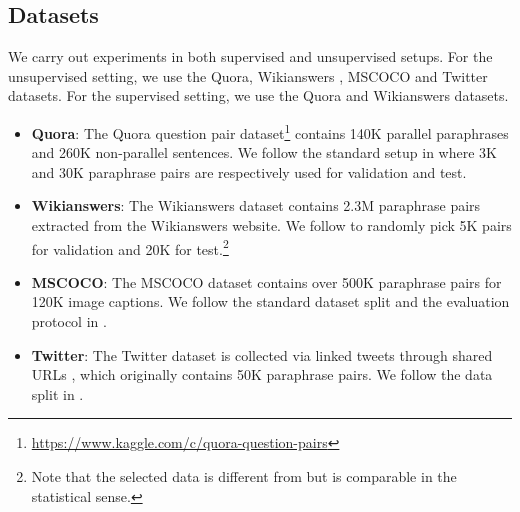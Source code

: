 \documentclass[11pt,a4paper]{article}
\begin{document}
\subsection{Datasets}
We carry out experiments in both supervised and unsupervised setups. 
For the unsupervised setting, we use the Quora, Wikianswers \citep{fader-etal-2013-paraphrase}, MSCOCO \citep{lin2014microsoft} and Twitter  \citep{lan-etal-2017-continuously} datasets. For the supervised setting, we use the Quora and Wikianswers datasets. 
\begin{itemize}[noitemsep]
  \item {\bf Quora}: The Quora question pair dataset\footnote{\url{https://www.kaggle.com/c/quora-question-pairs}} contains 140K parallel paraphrases and 260K non-parallel sentences. We follow the standard setup in \citet{miao2019cgmh} where 3K and 30K paraphrase pairs are respectively used for validation and test. 
  \item {\bf Wikianswers}: The Wikianswers dataset \citep{fader-etal-2013-paraphrase} contains 2.3M paraphrase pairs extracted from the Wikianswers website. We follow \citet{liu2019unsupervised} to randomly pick 5K pairs for validation and 20K for test.\footnote{Note that the selected data is different from \citet{liu2019unsupervised} but is comparable in the statistical sense.} 
  \item {\bf MSCOCO}: The MSCOCO dataset \citep{lin2014microsoft} contains over 500K paraphrase pairs for 120K image captions. We follow the standard dataset split and the evaluation protocol in \citet{liu2019unsupervised}.
  \item {\bf Twitter}: The Twitter dataset is collected via linked tweets through shared URLs \citep{lan-etal-2017-continuously}, which originally contains 50K paraphrase pairs. We follow the data split in \citet{liu2019unsupervised}.
\end{itemize}
\end{document}
